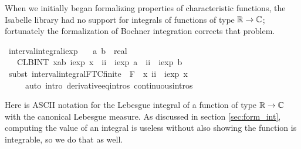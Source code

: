 \documentclass[leqno]{article}
\theoremstyle{definition}
\begin{document}
\medskip

When we initially began formalizing properties of characteristic functions, the Isabelle library had no support for integrals of functions of type $\mathbb{R} \rightarrow \mathbb{C}$; fortunately the formalization of Bochner integration corrects that problem.

\medskip

\begin{isabellebody}
\isamarkupfalse%
\ interval{\isacharunderscore}integral{\isacharunderscore}iexp{\isacharcolon}\isanewline
\ \ \ a\ b\ {\isacharcolon}{\isacharcolon}\ real\isanewline
\ \ \ {\isachardoublequoteopen}{\isacharparenleft}CLBINT\ x{\isacharequal}a{\isachardot}{\isachardot}b{\isachardot}\ iexp\ x{\isacharparenright}\ {\isacharequal}\ ii\ {\isacharasterisk}\ iexp\ a\ {\isacharminus}\ ii\ {\isacharasterisk}\ iexp\ b{\isachardoublequoteclose}\isanewline
{}\isamarkupfalse%
\ {\isacharparenleft}subst\ interval{\isacharunderscore}integral{\isacharunderscore}FTC{\isacharunderscore}finite\ {\isacharbrackleft}\ F\ {\isacharequal}\ {\isachardoublequoteopen}{\isasymlambda}x{\isachardot}\ {\isacharminus}ii\ {\isacharasterisk}\ iexp\ x{\isachardoublequoteclose}{\isacharbrackright}{\isacharparenright}\isanewline
\ \ \ \ \ {\isacharparenleft}auto\ intro{\isacharbang}{\isacharcolon}\ derivative{\isacharunderscore}eq{\isacharunderscore}intros\ continuous{\isacharunderscore}intros{\isacharparenright}%
\end{isabellebody}

\medskip

Here  is ASCII notation for the Lebesgue integral of a function of type $\mathbb{R} \rightarrow \mathbb{C}$ with the canonical Lebesgue measure. As discussed in section \ref{sec:form_int}, computing the value of an integral is useless without also showing the function is integrable, so we do that as well.

\medskip
\end{document}
